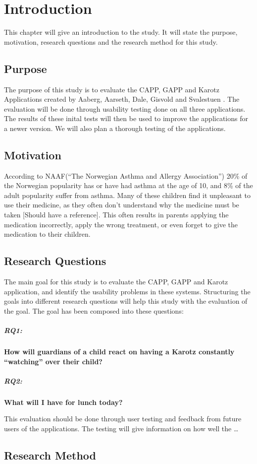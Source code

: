 \chapter{Introduction}
\label{introduction}

This chapter will give an introduction to the study. It will state the purpose, motivation, research questions and the research method for this study. 

\section{Purpose}
\label{purpose}
The purpose of this study is to evaluate the CAPP, GAPP and Karotz Applications created by Aaberg, Aarseth, Dale, Gisvold and Svalestuen \cite{CustomerDriven}.
The evaluation will be done through usability testing done on all three applications. The results of these inital tests will then be used to improve the applications for a newer version. 
We will also plan a thorough testing of the applications.


\section{Motivation}
\label{sec:motivation}
According to NAAF(``The Norwegian Asthma and Allergy Association'') 20\% of the Norwegian popularity has or have had asthma at the age of 10, and 8\% of the adult popularity suffer from asthma. Many of these children find it unpleasant to use their medicine, as they often don't understand why the medicine must be taken [Should have a reference]. This often results in parents applying the medication incorrectly, apply the wrong treatment, or even forget to give the medication to their children. 


\section{Research Questions}
\label{sec:researchquestions}
The main goal for this study is to evaluate the CAPP, GAPP and Karotz application, and identify the usability problems in these systems. Structuring the goals into different research questions will help this study with the evaluation of the goal. The goal has been composed into these questions:

\paragraph{RQ1:}
\textbf{How will guardians of a child react on having a Karotz constantly ``watching'' over their child?}


\paragraph{RQ2:}
\textbf{What will I have for lunch today?}

This evaluation should be done through user testing and feedback from future users of the applications. The testing will give information on how well the 
\ldots

\section{Research Method}
\label{researchmethod}


